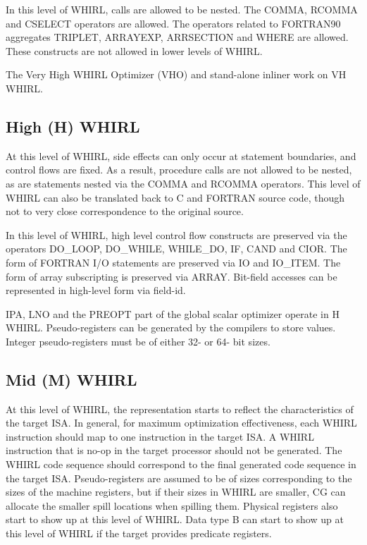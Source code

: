 \documentclass{article}
\begin{document}
In this level of WHIRL, calls are
allowed to be nested. The COMMA, RCOMMA and CSELECT operators are
allowed. The operators related to FORTRAN90 aggregates
TRIPLET, ARRAYEXP, ARRSECTION and WHERE are allowed. These constructs
are not allowed in lower levels of WHIRL.

The Very High WHIRL Optimizer (VHO) and stand-alone inliner work
on VH WHIRL.

\subsection{High (H) WHIRL}

At this level of WHIRL, side effects can only occur at statement
boundaries, and control flows are fixed. As a result, procedure
calls are not allowed to be nested, as are statements nested via
the COMMA and RCOMMA operators. This level of WHIRL can also be
translated back to C and FORTRAN source code, though not to very
close correspondence to the original source. 

In this level of WHIRL, high level control
flow constructs are preserved via the operators
DO\_LOOP, DO\_WHILE, WHILE\_DO, IF, CAND and CIOR. The form of FORTRAN
I/O statements are preserved via
IO and IO\_ITEM. The form of array subscripting is preserved via
ARRAY. Bit-field accesses can be represented in high-level form via
field-id.

IPA, LNO and the PREOPT part of the global scalar optimizer operate
in H WHIRL. Pseudo-registers can be generated by the compilers to
store values. Integer pseudo-registers must be of either 32- or
64- bit sizes.

\subsection{Mid (M) WHIRL}

At this level of WHIRL, the representation starts to reflect the
characteristics of the target ISA. In general, for maximum
optimization effectiveness, each WHIRL instruction should map to
one instruction in the target ISA. A WHIRL instruction that is no-op
in the target processor should not be generated. The WHIRL code
sequence should correspond to the final generated code sequence in the 
target ISA. Pseudo-registers
are assumed to be of sizes corresponding to the sizes of the
machine registers, but if their sizes in WHIRL are smaller, CG can
allocate the smaller spill locations when spilling them. Physical
registers also start to show up at this level of WHIRL. Data type
B can start to show up at this level of WHIRL if the target provides
predicate registers.
\end{document}
